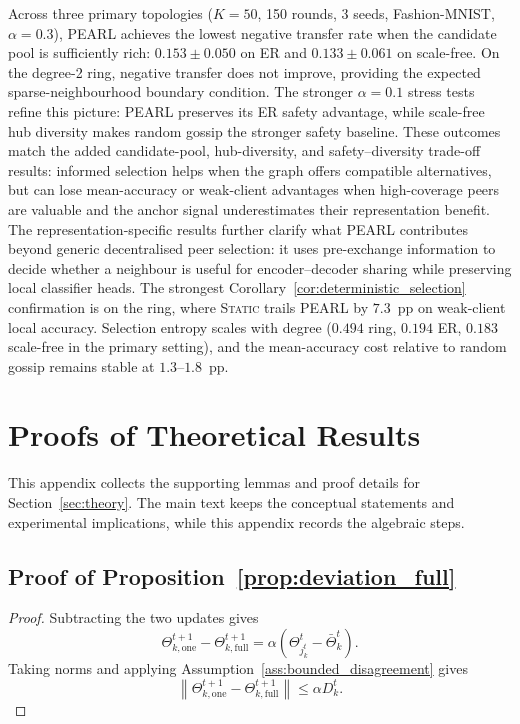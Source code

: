 \documentclass[conference]{IEEEtran}
\begin{document}
Across three primary topologies ($K=50$, 150 rounds, 3 seeds, Fashion-MNIST, $\alpha=0.3$), \textsc{PEARL} achieves the lowest negative transfer rate when the candidate pool is sufficiently rich: $0.153\pm0.050$ on ER and $0.133\pm0.061$ on scale-free. On the degree-2 ring, negative transfer does not improve, providing the expected sparse-neighbourhood boundary condition. The stronger $\alpha=0.1$ stress tests refine this picture: PEARL preserves its ER safety advantage, while scale-free hub diversity makes random gossip the stronger safety baseline. These outcomes match the added candidate-pool, hub-diversity, and safety--diversity trade-off results: informed selection helps when the graph offers compatible alternatives, but can lose mean-accuracy or weak-client advantages when high-coverage peers are valuable and the anchor signal underestimates their representation benefit. The representation-specific results further clarify what PEARL contributes beyond generic decentralised peer selection: it uses pre-exchange information to decide whether a neighbour is useful for encoder--decoder sharing while preserving local classifier heads. The strongest Corollary~\ref{cor:deterministic_selection} confirmation is on the ring, where \textsc{Static} trails \textsc{PEARL} by $7.3$~pp on weak-client local accuracy. Selection entropy scales with degree ($0.494$ ring, $0.194$ ER, $0.183$ scale-free in the primary setting), and the mean-accuracy cost relative to random gossip remains stable at $1.3$--$1.8$~pp.

\appendices
\section{Proofs of Theoretical Results}
\label{app:proofs}

This appendix collects the supporting lemmas and proof details for Section~\ref{sec:theory}. The main text keeps the conceptual statements and experimental implications, while this appendix records the algebraic steps.

\subsection{Proof of Proposition~\ref{prop:deviation_full}}
\begin{proof}
Subtracting the two updates gives
\[
\Theta_{k,\mathrm{one}}^{t+1}
-
\Theta_{k,\mathrm{full}}^{t+1}
=
\alpha(\Theta_{j_k^t}^t-\bar{\Theta}_k^t).
\]
Taking norms and applying Assumption~\ref{ass:bounded_disagreement} gives
\[
\left\|
\Theta_{k,\mathrm{one}}^{t+1}
-
\Theta_{k,\mathrm{full}}^{t+1}
\right\|
\leq
\alpha D_k^t .
\]
\end{proof}
\end{document}

